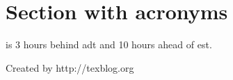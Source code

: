 \documentclass{article}
\begin{document}
 
\section*{Section with acronyms}
 

 
is 3 hours behind \gls{adt} and 10 hours ahead of \gls{est}.
 
\printglossaries
 
\small\hfill Created by http://texblog.org
 
\end{document}

